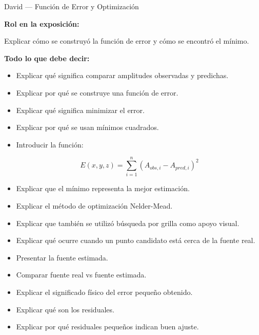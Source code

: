 \documentclass[aspectratio=169]{beamer}
\begin{document}
\begin{frame}{David — Función de Error y Optimización}

\textbf{Rol en la exposición:}

Explicar cómo se construyó la función de error y cómo se encontró el mínimo.

\vspace{0.4cm}

\textbf{Todo lo que debe decir:}

\begin{itemize}
    \item Explicar qué significa comparar amplitudes observadas y predichas.
    \item Explicar por qué se construye una función de error.
    \item Explicar qué significa minimizar el error.
    \item Explicar por qué se usan mínimos cuadrados.
    \item Introducir la función:
    
    $$
    E(x,y,z)=\sum_{i=1}^{n}(A_{obs,i}-A_{pred,i})^2
    $$

    \item Explicar que el mínimo representa la mejor estimación.
    \item Explicar el método de optimización Nelder-Mead.
    \item Explicar que también se utilizó búsqueda por grilla como apoyo visual.
    \item Explicar qué ocurre cuando un punto candidato está cerca de la fuente real.
    \item Presentar la fuente estimada.
    \item Comparar fuente real vs fuente estimada.
    \item Explicar el significado físico del error pequeño obtenido.
    \item Explicar qué son los residuales.
    \item Explicar por qué residuales pequeños indican buen ajuste.
\end{itemize}

\end{frame}

\end{document}
